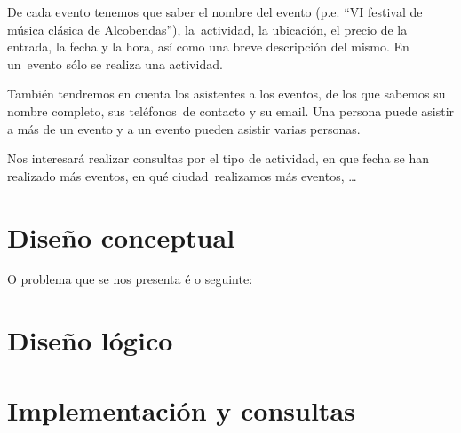 \documentclass[a4paper,onecolumn]{article}
\let\stdsection\section
\renewcommand\section{\newpage\stdsection}
\begin{document}
\begin{sloppypar}
De cada evento tenemos que saber el nombre del evento (p.e. “VI festival de música clásica de Alcobendas”), la\
actividad, la ubicación, el precio de la entrada, la fecha y la hora, así como una breve descripción del mismo. En un\
evento sólo se realiza una actividad.

También tendremos en cuenta los asistentes a los eventos, de los que sabemos su nombre completo, sus teléfonos\
de contacto y su email. Una persona puede asistir a más de un evento y a un evento pueden asistir varias personas.

Nos interesará realizar consultas por el tipo de actividad, en que fecha se han realizado más eventos, en qué ciudad\
realizamos más eventos, …

\section{Diseño conceptual} \label{mer}
O problema que se nos presenta é o seguinte:


\section{Diseño lógico} \label{mr}

\section{Implementación y consultas} \label{sql}


\end{sloppypar}
\end{document}
